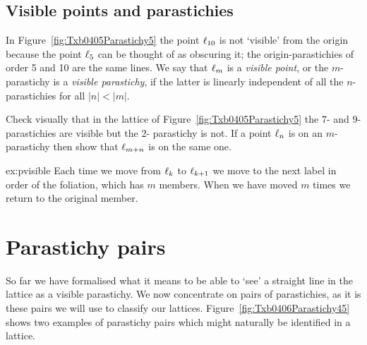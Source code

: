 \subsection{Visible points and parastichies}
In Figure~\ref{fig:Txb0405Parastichy5} the point $\ell_{{10}}$ is not `visible' from the origin because the point $\ell_{{5}}$ can be thought of as obscuring it; the 
origin-parastichies of order 5 and 10 are the same lines. 
We say that $\ell_{{m}}$ is a \emph{visible point}, or the $m$-parastichy is a \emph{visible parastichy}, if the latter is linearly independent of all the $n$-parastichies for all $|n|<|m|$. 
\begin{jExercise}\label{ex:pvisible}
	Check  visually that in the lattice of Figure~\ref{fig:Txb0405Parastichy5} the $7$- and $9$- parastichies are visible but the $2$- parastichy is not.
If a point $\ell_{{n}}$ is on an $m$-parastichy then show that $\ell_{{m+n}}$ is on the same one.
\label{ex:bb}
\end{jExercise}
\begin{jAnswer}{ex:pvisible}{
	Each time we move from $\ell_{{k}}$ to $\ell_{{k+1}}$ we move to the next label in order of the foliation, which has $m$ members. When we have moved $m$ times we return to the original member.
}
\end{jAnswer}


\section{Parastichy pairs}

So far we have formalised what it means to be able to `see' a straight line in the lattice as a visible parastichy. We now concentrate on pairs of parastichies, as it is these pairs we will use to classify our lattices. Figure~\ref{fig:Txb0406Parastichy45} shows two examples of parastichy pairs which might naturally be identified in a lattice. 


